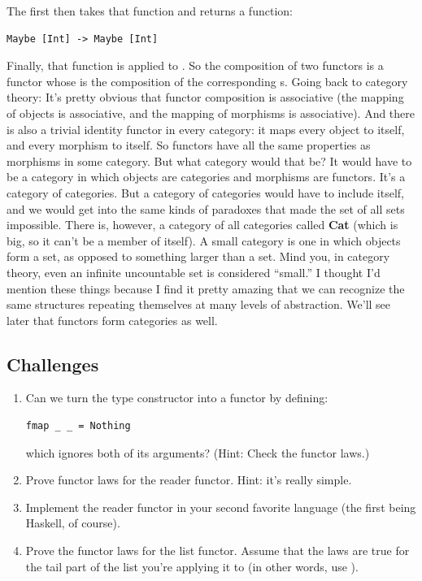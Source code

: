 The first  then takes that function and returns a function:

\begin{verbatim}
Maybe [Int] -> Maybe [Int]
\end{verbatim}

Finally, that function is applied to . So the composition of
two functors is a functor whose  is the composition of the
corresponding s. Going back to category theory: It's pretty
obvious that functor composition is associative (the mapping of objects
is associative, and the mapping of morphisms is associative). And there
is also a trivial identity functor in every category: it maps every
object to itself, and every morphism to itself. So functors have all the
same properties as morphisms in some category. But what category would
that be? It would have to be a category in which objects are categories
and morphisms are functors. It's a category of categories. But a
category of  categories would have to include itself, and we
would get into the same kinds of paradoxes that made the set of all sets
impossible. There is, however, a category of all  categories
called \textbf{Cat} (which is big, so it can't be a member of itself). A
small category is one in which objects form a set, as opposed to
something larger than a set. Mind you, in category theory, even an
infinite uncountable set is considered ``small.'' I thought I'd mention
these things because I find it pretty amazing that we can recognize the
same structures repeating themselves at many levels of abstraction.
We'll see later that functors form categories as well.

\subsection{Challenges}\label{challenges}

\begin{enumerate}
\item
  Can we turn the  type constructor into a functor by
  defining:

\begin{verbatim}
fmap _ _ = Nothing
\end{verbatim}

  which ignores both of its arguments? (Hint: Check the functor laws.)
\item
  Prove functor laws for the reader functor. Hint: it's really simple.
\item
  Implement the reader functor in your second favorite language (the
  first being Haskell, of course).
\item
  Prove the functor laws for the list functor. Assume that the laws are
  true for the tail part of the list you're applying it to (in other
  words, use ).
\end{enumerate}

